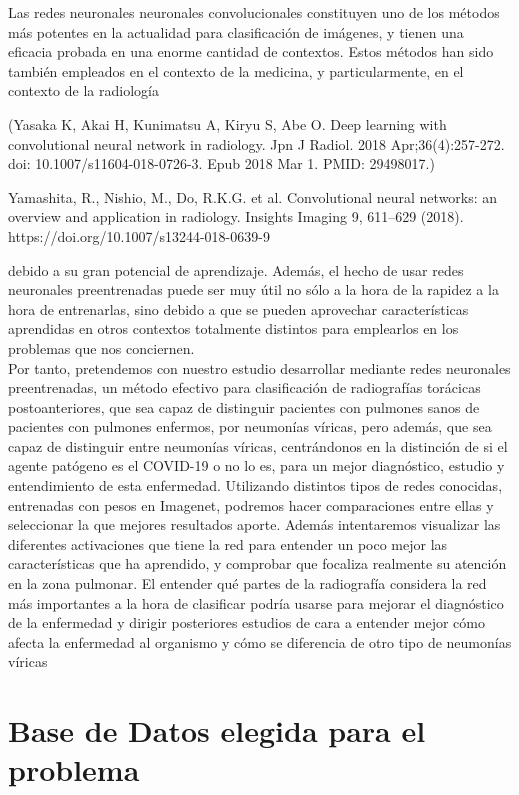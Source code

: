 \documentclass[11pt,a4paper]{article}
\theoremstyle{definition}
\begin{document}
Las redes neuronales neuronales convolucionales constituyen uno de los métodos más potentes en la actualidad para clasificación de imágenes,  y tienen una eficacia probada en una enorme cantidad de contextos.  Estos métodos han sido también empleados en el contexto de la medicina, y particularmente, en el contexto de la radiología

(Yasaka K, Akai H, Kunimatsu A, Kiryu S, Abe O. Deep learning with convolutional neural network in radiology. Jpn J Radiol. 2018 Apr;36(4):257-272. doi: 10.1007/s11604-018-0726-3. Epub 2018 Mar 1. PMID: 29498017.)

Yamashita, R., Nishio, M., Do, R.K.G. et al. Convolutional neural networks: an overview and application in radiology. Insights Imaging 9, 611–629 (2018). https://doi.org/10.1007/s13244-018-0639-9

debido a su gran potencial de aprendizaje. Además, el hecho de usar redes neuronales preentrenadas puede ser muy útil no sólo a la hora de la rapidez a la hora de entrenarlas, sino debido a que se pueden aprovechar características aprendidas en otros contextos totalmente distintos para emplearlos en los problemas que nos conciernen.\\

Por tanto,  pretendemos con nuestro estudio desarrollar mediante redes neuronales preentrenadas, un método efectivo para clasificación de radiografías torácicas postoanteriores, que sea capaz de distinguir pacientes con pulmones sanos de pacientes con pulmones enfermos, por neumonías víricas, pero además, que sea capaz de distinguir entre neumonías víricas, centrándonos en la distinción de si el agente patógeno es el COVID-19 o no lo es, para un mejor diagnóstico, estudio y entendimiento de esta enfermedad.  Utilizando distintos tipos de redes conocidas, entrenadas con pesos en Imagenet, podremos hacer comparaciones entre ellas y seleccionar la que mejores resultados aporte. Además intentaremos visualizar las diferentes activaciones que tiene la red para entender un poco mejor las características que ha aprendido, y comprobar que focaliza realmente su atención en la zona pulmonar.  El entender qué partes de la radiografía considera la red más importantes a la hora de clasificar podría usarse para mejorar el diagnóstico de la enfermedad y dirigir posteriores estudios de cara a entender mejor cómo afecta la enfermedad al organismo y cómo se diferencia de otro tipo de neumonías víricas \\
 
\section{Base de Datos elegida para el problema}
\end{document}
